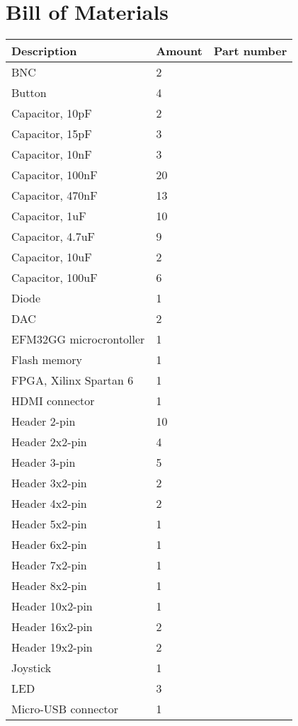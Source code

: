 \chapter{Bill of Materials}
\label{app:bom}
\begin{longtable}{| p{5cm} | p{2cm} | p{2cm} |}
	\hline
	\textbf{Description} & \textbf{Amount} & \textbf{Part number} \\ [0.5ex]
	\hline
	BNC & 2 &\\ \hline
	Button & 4 &\\ \hline
	Capacitor, 10pF & 2 &\\ \hline
	Capacitor, 15pF & 3 &\\ \hline
	Capacitor, 10nF & 3 &\\ \hline
	Capacitor, 100nF & 20 &\\ \hline
	Capacitor, 470nF & 13 &\\ \hline
	Capacitor, 1uF & 10 &\\ \hline
	Capacitor, 4.7uF & 9 &\\ \hline
	Capacitor, 10uF & 2 &\\ \hline
	Capacitor, 100uF & 6 &\\ \hline
	Diode & 1 &\\ \hline
	DAC & 2 &\\ \hline
	EFM32GG microcrontoller & 1 &\\ \hline
	Flash memory & 1 &\\ \hline
	FPGA, Xilinx Spartan 6 & 1 &\\ \hline
	HDMI connector & 1 &\\ \hline
	Header 2-pin & 10 &\\ \hline
	Header 2x2-pin & 4 &\\ \hline
	Header 3-pin & 5 &\\ \hline
	Header 3x2-pin & 2 &\\ \hline
	Header 4x2-pin & 2 &\\ \hline
	Header 5x2-pin & 1 &\\ \hline
	Header 6x2-pin & 1 &\\ \hline
	Header 7x2-pin & 1 &\\ \hline
	Header 8x2-pin & 1 &\\ \hline
	Header 10x2-pin & 1 &\\ \hline
	Header 16x2-pin & 2 &\\ \hline
	Header 19x2-pin & 2 &\\ \hline
	Joystick & 1 &\\ \hline
	LED & 3 &\\ \hline
	Micro-USB connector & 1 &\\ \hline

\end{longtable}
